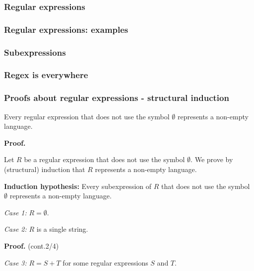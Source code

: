 \begin{frame}
  \frametitle{Regular expressions}
\end{frame}

\begin{frame}
  \frametitle{Regular expressions: examples}
\end{frame}

\begin{frame}
  \frametitle{Subexpressions}
\end{frame}

\begin{frame}
  \frametitle{Regex is everywhere}
\end{frame}

\begin{frame}
  \frametitle{Proofs about regular expressions - structural induction} 
\end{frame}

\begin{frame}
  \begin{lemma}
    Every regular expression that does not use the symbol $\emptyset$
    represents a non-empty language.
  \end{lemma}

  {\bf Proof.}
  
  \pause

  Let $R$ be a regular expression that does not use the symbol
  $\emptyset$.  We prove by (structural) induction that $R$ represents
  a non-empty language.

  \pause

  {\bf Induction hypothesis:} Every subexpression of $R$ that does not
  use the symbol $\emptyset$ represents a non-empty language.
  
  \pause

  {\em Case 1:} $R=\emptyset$.
  \vspace{0.5in}

  \pause

  {\em Case 2:} $R$ is a single string.

  \pause
  \vspace{1.5in}
  
\end{frame}

\begin{frame}{}
  
  {\bf Proof.} (cont.2/4)
  
  {\em Case 3:} $R=S+T$ for some regular expressions $S$ and $T$.

  \vspace{2.5in}
\end{frame}


